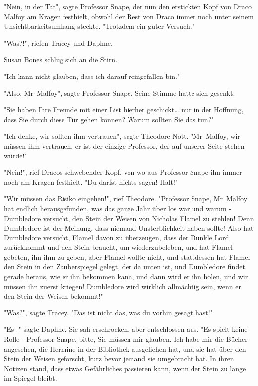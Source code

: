 {"Nein, in der Tat", sagte Professor Snape, der nun den erstickten Kopf von Draco Malfoy am Kragen festhielt, obwohl der Rest von Draco immer noch unter seinem Unsichtbarkeitsumhang steckte. "Trotzdem ein guter Versuch."

"Was?!", riefen Tracey und Daphne.

Susan Bones schlug sich an die Stirn.

"Ich kann nicht glauben, dass ich darauf reingefallen bin."

"Also, Mr~Malfoy", sagte Professor Snape. Seine Stimme hatte sich gesenkt.

"Sie haben Ihre Freunde mit einer List hierher geschickt… nur in der Hoffnung, dass Sie durch diese Tür gehen können? Warum sollten Sie das tun?"

"Ich denke, wir sollten ihm vertrauen", sagte Theodore Nott. "Mr~Malfoy, wir müssen ihm vertrauen, er ist der einzige Professor, der auf unserer Seite stehen würde!"

"Nein!", rief Dracos schwebender Kopf, von wo aus Professor Snape ihn immer noch am Kragen festhielt. "Du darfst nichts sagen! Halt!"

"Wir müssen das Risiko eingehen!", rief Theodore. "Professor Snape, Mr~Malfoy hat endlich herausgefunden, was das ganze Jahr über los war und warum - Dumbledore versucht, den Stein der Weisen von Nicholas Flamel zu stehlen! Denn Dumbledore ist der Meinung, dass niemand Unsterblichkeit haben sollte! Also hat Dumbledore versucht, Flamel davon zu überzeugen, dass der Dunkle Lord zurückkommt und den Stein braucht, um wiederzubeleben, und hat Flamel gebeten, ihn ihm zu geben, aber Flamel wollte nicht, und stattdessen hat Flamel den Stein in den Zauberspiegel gelegt, der da unten ist, und Dumbledore findet gerade heraus, wie er ihn bekommen kann, und dann wird er ihn holen, und wir müssen ihn zuerst kriegen! Dumbledore wird wirklich allmächtig sein, wenn er den Stein der Weisen bekommt!"

"Was?", sagte Tracey. "Das ist nicht das, was du vorhin gesagt hast!"

"Es -" sagte Daphne. Sie sah erschrocken, aber entschlossen aus. "Es spielt keine Rolle - Professor Snape, bitte, Sie müssen mir glauben. Ich habe mir die Bücher angesehen, die Hermine in der Bibliothek ausgeliehen hat, und sie hat über den Stein der Weisen geforscht, kurz bevor jemand sie umgebracht hat. In ihren Notizen stand, dass etwas Gefährliches passieren kann, wenn der Stein zu lange im Spiegel bleibt.

}

